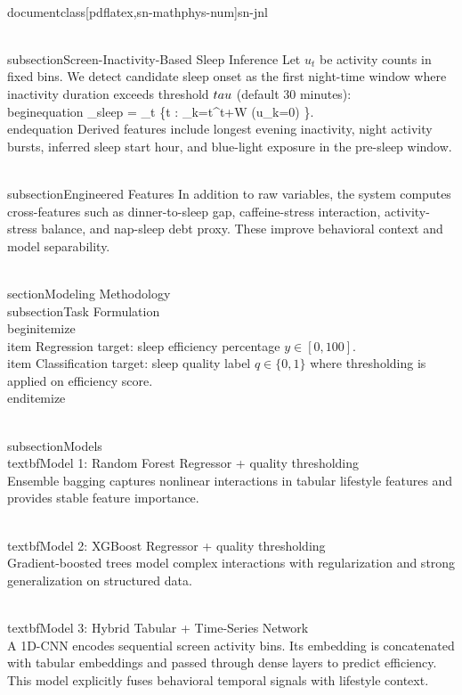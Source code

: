 \\documentclass[pdflatex,sn-mathphys-num]{sn-jnl}
\begin{document}
\\subsection{Screen-Inactivity-Based Sleep Inference}
Let $u_t$ be activity counts in fixed bins. We detect candidate sleep onset as the first night-time window where inactivity duration exceeds threshold $\\tau$ (default 30 minutes):
\\begin{equation}
_{sleep} = \arg\min_t \{t \in [20{:}00, 03{:}00] : \sum_{k=t}^{t+W} (u_k=0) \ge \tau\}.
\\end{equation}
Derived features include longest evening inactivity, night activity bursts, inferred sleep start hour, and blue-light exposure in the pre-sleep window.

\\subsection{Engineered Features}
In addition to raw variables, the system computes cross-features such as dinner-to-sleep gap, caffeine-stress interaction, activity-stress balance, and nap-sleep debt proxy. These improve behavioral context and model separability.

\\section{Modeling Methodology}
\\subsection{Task Formulation}
\\begin{itemize}
    \\item Regression target: sleep efficiency percentage $y \in [0,100]$.
    \\item Classification target: sleep quality label $q \in \{0,1\}$ where thresholding is applied on efficiency score.
\\end{itemize}

\\subsection{Models}
\\textbf{Model 1: Random Forest Regressor + quality thresholding}\\
Ensemble bagging captures nonlinear interactions in tabular lifestyle features and provides stable feature importance.

\\textbf{Model 2: XGBoost Regressor + quality thresholding}\\
Gradient-boosted trees model complex interactions with regularization and strong generalization on structured data.

\\textbf{Model 3: Hybrid Tabular + Time-Series Network}\\
A 1D-CNN encodes sequential screen activity bins. Its embedding is concatenated with tabular embeddings and passed through dense layers to predict efficiency. This model explicitly fuses behavioral temporal signals with lifestyle context.
\end{document}
